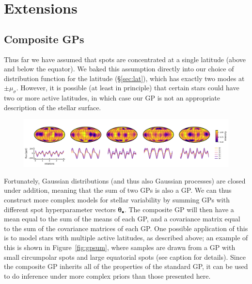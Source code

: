 \documentclass[modern,linenumbers]{aastex62}
\begin{document}
\section{Extensions}
\label{sec:extensions}

\subsection{Composite GPs}
\label{sec:mixture}
Thus far we have assumed that spots are concentrated at a single latitude
(above and below the equator). We baked this assumption directly into our choice of
distribution function for the latitude (\S\ref{sec:lat}), which has exactly
two modes at $\pm \mu_\sigma$. However, it is possible (at least in principle)
that certain stars could have two or more active latitudes, in which case
our GP is not an appropriate description of the stellar surface.

\begin{figure}[t!]
    \begin{centering}
        \includegraphics[width=\linewidth]{figures/gpsum.pdf}
    \end{centering}
\end{figure}

Fortunately, Gaussian distributions (and thus also Gaussian processes) are
closed under addition, meaning that the sum of two GPs is also a GP. We can thus
construct more complex models for stellar variability by summing GPs with different
spot hyperparameter vectors $\pmb{\theta}_\bullet$. The composite GP will then
have a mean equal to the sum of the means of each GP, and a covariance matrix equal
to the sum of the covariance matrices of each GP. One possible application of this
is to model stars with multiple active latitudes, as described above; an example
of this is shown in Figure~\ref{fig:gpsum}, where samples are drawn from a GP with
small circumpolar spots and large equatorial spots (see caption for details).
Since the composite GP inherits all of the properties of the standard GP, it can
be used to do inference under more complex priors than those presented here.
\end{document}
